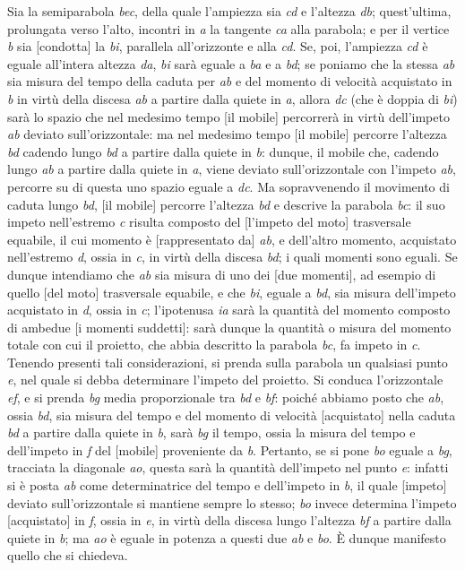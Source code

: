 \documentclass[11pt,twoside,openany]{book}
\begin{document}
Sia la semiparabola \emph{bec}, della quale l'ampiezza sia \emph{cd} e l'altezza \emph{db}; quest'ultima, prolungata verso l'alto, incontri in \emph{a} la tangente \emph{ca} alla parabola; e per il vertice \emph{b} sia [condotta] la \emph{bi}, parallela all'orizzonte e alla \emph{cd}. Se, poi, l'ampiezza \emph{cd} è eguale all'intera altezza \emph{da}, \emph{bi} sarà eguale a \emph{ba} e a \emph{bd}; se poniamo che la stessa \emph{ab} sia misura del tempo della caduta per \emph{ab} e del momento di velocità acquistato in \emph{b} in virtù della discesa \emph{ab} a partire dalla quiete in \emph{a}, allora \emph{dc} (che è doppia di \emph{bi}) sarà lo spazio che nel medesimo tempo [il mobile] percorrerà in virtù dell'impeto \emph{ab} deviato sull'orizzontale: ma nel medesimo tempo [il mobile] percorre l'altezza \emph{bd} cadendo lungo \emph{bd} a partire dalla quiete in \emph{b}: dunque, il mobile che, cadendo lungo \emph{ab} a partire dalla quiete in \emph{a}, viene deviato sull'orizzontale con l'impeto \emph{ab}, percorre su di questa uno spazio eguale a \emph{dc}. Ma sopravvenendo il movimento di caduta lungo \emph{bd}, [il mobile] percorre l'altezza \emph{bd} e descrive la parabola \emph{bc}: il suo impeto nell'estremo \emph{c} risulta composto del [l'impeto del moto] trasversale equabile, il cui momento è [rappresentato da] \emph{ab}, e dell'altro momento, acquistato nell'estremo \emph{d}, ossia in \emph{c}, in virtù della discesa \emph{bd}; i quali momenti sono eguali. Se dunque intendiamo che \emph{ab} sia misura di uno dei [due momenti], ad esempio di quello [del moto] trasversale equabile, e che \emph{bi}, eguale a \emph{bd}, sia misura dell'impeto acquistato in \emph{d}, ossia in \emph{c}; l'ipotenusa \emph{ia} sarà la quantità del momento composto di ambedue [i momenti suddetti]: sarà dunque la quantità o misura del momento totale con cui il proietto, che abbia descritto la parabola \emph{bc}, fa impeto in \emph{c}. Tenendo presenti tali considerazioni, si prenda sulla parabola un qualsiasi punto \emph{e}, nel quale si debba determinare l'impeto del proietto. Si conduca l'orizzontale \emph{ef}, e si prenda \emph{bg} media proporzionale tra \emph{bd} e \emph{bf}: poiché abbiamo posto che \emph{ab}, ossia \emph{bd}, sia misura del tempo e del momento di velocità [acquistato] nella caduta \emph{bd} a partire dalla quiete in \emph{b}, sarà \emph{bg} il tempo, ossia la misura del tempo e dell'impeto in \emph{f} del [mobile] proveniente da \emph{b}. Pertanto, se si pone \emph{bo} eguale a \emph{bg}, tracciata la diagonale \emph{ao}, questa sarà la quantità dell'impeto nel punto \emph{e}: infatti si è posta \emph{ab} come determinatrice del tempo e dell'impeto in \emph{b}, il quale [impeto] deviato sull'orizzontale si mantiene sempre lo stesso; \emph{bo} invece determina l'impeto [acquistato] in \emph{f}, ossia in \emph{e}, in virtù della discesa lungo l'altezza \emph{bf} a partire dalla quiete in \emph{b}; ma \emph{ao} è eguale in potenza a questi due \emph{ab} e \emph{bo}. È dunque manifesto quello che si chiedeva.
\end{document}

